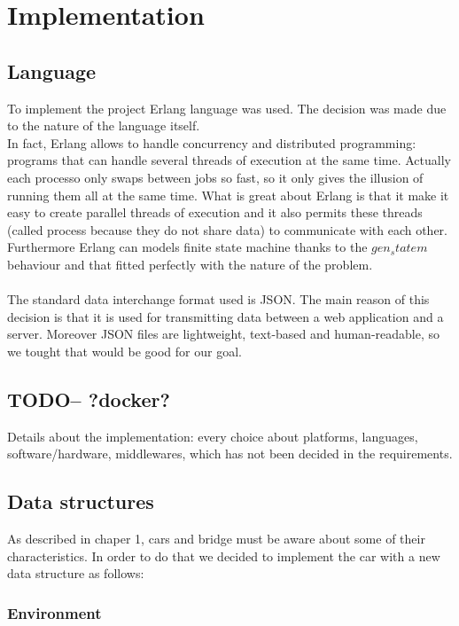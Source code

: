 \chapter{Implementation}\label{ch:implementation}

\section{Language}
To implement the project Erlang language was used. The decision was made due to the nature of the language itself.\\
In fact, Erlang allows to handle concurrency and distributed programming: programs that can handle several threads of execution at the same time. 
Actually each processo only swaps between jobs so fast, so it only gives the illusion of running them all at the same time. 
What is great about Erlang is that it make it easy to create parallel threads of execution and it also permits these
threads (called process because they do not share data) to communicate with each other.\\
Furthermore Erlang can models finite state machine thanks to the $gen_statem$ behaviour and that fitted perfectly
with the nature of the problem.\\ \\
The standard data interchange format used is JSON. The main reason of this decision is that it is used 
for transmitting data between a web application and a server. 
Moreover JSON files are lightweight, text-based and human-readable, so we tought that would be good for our goal.

\section{TODO-- ?docker?}
Details about the implementation: every choice about platforms, languages, software/hardware, middlewares, which has not been decided in the requirements.

\section{Data structures}
As described in chaper 1, cars and bridge must be aware about some of their characteristics.
In order to do that we decided to implement the car with a new data structure as follows:

\subsection{Environment}

